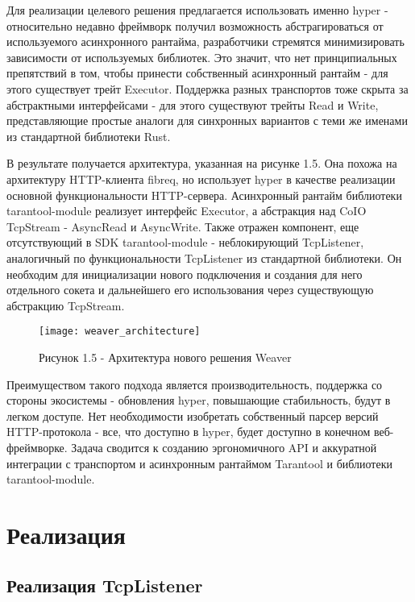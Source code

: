 \documentclass[times,numbers=noenddot]{itmo-student-thesis}
\begin{document}
Для реализации целевого решения предлагается использовать именно hyper - относительно недавно фреймворк получил возможность абстрагироваться от используемого асинхронного рантайма, разработчики стремятся минимизировать зависимости от используемых библиотек.
Это значит, что нет принципиальных препятствий в том, чтобы принести собственный асинхронный рантайм - для этого существует трейт Executor.
Поддержка разных транспортов тоже скрыта за абстрактными интерфейсами - для этого существуют трейты Read и Write, представляющие простые аналоги для синхронных вариантов с теми же именами из стандартной библиотеки Rust.

В результате получается архитектура, указанная на рисунке 1.5.
Она похожа на архитектуру HTTP-клиента fibreq, но использует hyper в качестве реализации основной функциональности HTTP-сервера.
Асинхронный рантайм библиотеки tarantool-module реализует интерфейс Executor, а абстракция над CoIO TcpStream - AsyncRead и AsyncWrite.
Также отражен компонент, еще отсутствующий в SDK tarantool-module - неблокирующий TcpListener, аналогичный по функциональности TcpListener из стандартной библиотеки.
Он необходим для инициализации нового подключения и создания для него отдельного сокета и дальнейшего его использования через существующую абстракцию TcpStream.

\begin{figure}[!h]
	\caption*{Рисунок 1.5 - Архитектура нового решения Weaver}\label{fig5}
	\centering
	\texttt{[image: weaver\_architecture]}
\end{figure}

Преимуществом такого подхода является производительность, поддержка со стороны экосистемы - обновления hyper, повышающие стабильность, будут в легком доступе.
Нет необходимости изобретать собственный парсер версий HTTP-протокола - все, что доступно в hyper, будет доступно в конечном веб-фреймворке.
Задача сводится к созданию эргономичного API и аккуратной интеграции с транспортом и асинхронным рантаймом Tarantool и библиотеки tarantool-module.

\leftalignedtrue
\chapter{Реализация}
\leftalignedfalse

\section{Реализация TcpListener}\label{sec:impl_tcp_listener}
\end{document}
